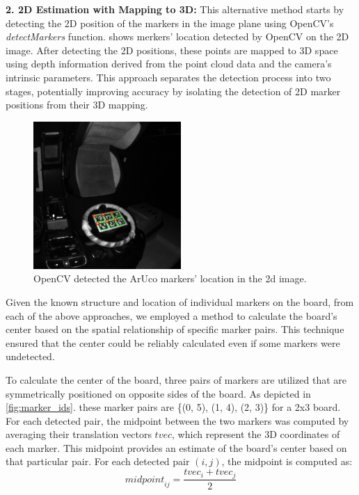 \textbf{2. 2D Estimation with Mapping to 3D: }
This alternative method starts by detecting the 2D position of 
the markers in the image plane using OpenCV’s \emph{detectMarkers} 
function.  shows merkers' location detected 
by OpenCV on the 2D image.
After detecting the 2D positions, these points are 
mapped to 3D space using depth information derived from the 
point cloud data and the camera’s intrinsic parameters. 
This approach separates the detection process into two stages, 
potentially improving accuracy by isolating the detection of 
2D marker positions from their 3D mapping.
\begin{figure}[htpb]
    \centering
    \includegraphics[width=0.5\textwidth]{media/chapter 5/aruco_detection.png}
    \caption{OpenCV detected the ArUco markers' location in the 2d image.}
    \label{fig:detectMarkers}
\end{figure}


Given the known structure and location of individual markers on 
the board, from each of the above approaches, 
we employed a method to calculate the board’s center based on the 
spatial relationship of specific marker pairs. This technique ensured 
that the center could be reliably calculated even if some markers were 
undetected.

To calculate the center of the board, three pairs of markers are utilized 
that are symmetrically positioned on opposite sides of the board. As depicted
in \cref{fig:marker_ids}. these marker pairs are \{(0, 5), (1, 4), (2, 3)\}
for a 2x3 board. 
For each detected pair, the midpoint between the two markers was 
computed by averaging their translation vectors \( tvec \), which 
represent the 3D coordinates of each marker. This midpoint provides an 
estimate of the board’s center based on that particular pair.
For each detected pair \((i, j)\), the midpoint is computed as:
\[
{midpoint}_{ij} = \frac{tvec_i + tvec_j}{2}
\]

